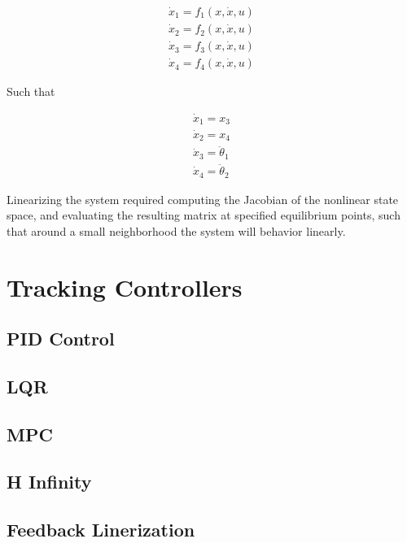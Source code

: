 \documentclass[journal]{IEEEtran}
\begin{document}
\begin{equation}
\begin{array}{l}
\dot{x}_{1}=f_{1}(x, \dot{x}, u) \\
\dot{x}_{2}=f_{2}(x, \dot{x}, u) \\
\dot{x}_{3}=f_{3}(x, \dot{x}, u) \\
\dot{x}_{4}=f_{4}(x, \dot{x}, u)
\end{array}
\end{equation}


Such that


\begin{equation}
\begin{array}{l}
\dot{x}_{1}=x_{3} \\
\dot{x}_{2}=x_{4} \\
\dot{x}_{3}=\ddot{\theta}_{1} \\
\dot{x}_{4}=\ddot{\theta}_{2}
\end{array}
\end{equation}



Linearizing the system required computing the Jacobian of the nonlinear state space, and evaluating the resulting matrix at specified equilibrium points, such that around a small neighborhood the system will behavior linearly.



\section{Tracking Controllers}

 \subsection{PID Control}

 \subsection{LQR}

 \subsection{MPC}

 \subsection{H Infinity}

 \subsection{Feedback Linerization}
\end{document}
